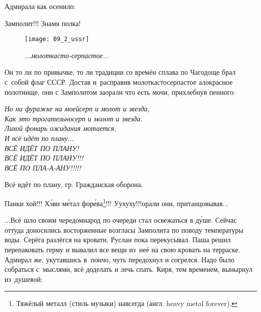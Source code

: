 Адмирала как осенило:

\diagdash Замполит!!! Знамя полка!

{
	\setlength{\belowcaptionskip}{-10mm}
	\begin{figure}[h]
		\centering
		\texttt{[image: 09\_2\_ussr]}
		\caption{\small\textit{...молоткасто-серпастое...}}
	\end{figure}
}

Он то ли по привычке, то ли традиции со времён сплава по Чагодоще брал с~собой флаг СССР. Достав и~расправив молоткасто\sdash серпастое ало\sdash красное полотнище, они с Замполитом заорали что есть мочи, прихлебнув пенного:

\vspace{0.2cm}
\noindent\textit{%
	\hspace*{1.2cm}Но на фуражке на моей\mdash серп и молот и звезда,\\
	\hspace*{1.2cm}Как это трогательно\mdash серп и молот и звезда.\\
	\hspace*{1.2cm}Лихой фонарь ожидания мотается,\\
	\hspace*{1.2cm}И всё идёт по плану$\ldots$\\
	\hspace*{1.2cm}\large{ВСЁ ИДЁТ ПО ПЛАНУ!}\\
	\hspace*{1.2cm}\Large{ВСЁ ИДЁТ ПО ПЛАНУ!!!}\\
	\hspace*{1.2cm}\LARGE{ВСЁ ПО ПЛА-А-АНУ!!!!!}
}

{\raggedleft \scriptsize \mdash Всё идёт по плану, гр. Гражданская оборона. \par}

\diagdash Панки хой!!! Х\'{э}ви м\'{е}тал фор\'{е}ва\footnote{Тяжёлый металл (стиль музыки) навсегда (англ. heavy metal forever).}!!! У\sdash у\sdash х\sdash у\sdash х\sdash у!!!\mdash орали они, пританцовывая$\ldots$

\vspace{0.5cm}
$\ldots$Всё шло своим чередом\mdash народ по очереди стал освежаться в д\'{у}ше. Сейчас оттуда доносились восторженные возгласы Замполита по поводу температуры воды. Серёга разлёгся на кровати, Руслан пока перекусывал. Паша решил перепаковать герму и вывалил все вещи из~неё на свою кровать на терраске. Адмирал же, укутавшись в~пончо, чуть передохнул и согрелся. Надо было собраться с~мыслями, всё доделать и лечь спать. Киря, тем временем, вынырнул из~душевой:

